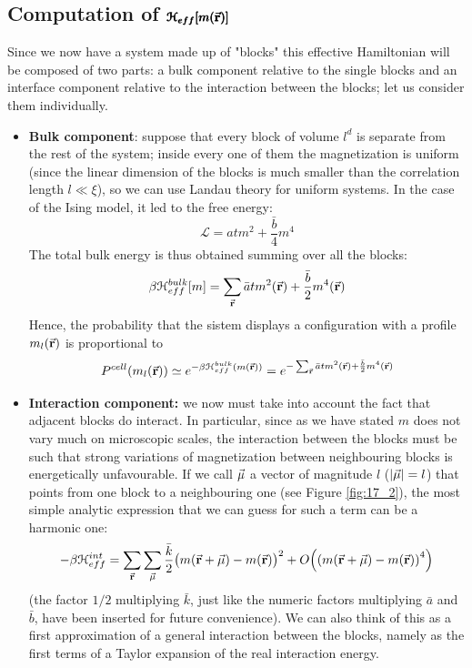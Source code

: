 \documentclass[../../Main/Main.tex]{subfiles}
\begin{document}
\subsection{Computation of \( \pmb{\mathcal{H}_{eff} [m(\va{r})]}\)}
 Since we now have a system made up of "blocks" this effective Hamiltonian will be composed of two parts: a bulk component relative to the single blocks and an interface component relative to the interaction between the blocks; let us consider them individually.

 \begin{itemize}
 \item \textbf{Bulk component}: suppose that every block of volume \( l^d \)  is separate from the rest of the system; inside every one of them the magnetization is uniform (since the linear dimension of the blocks is much smaller than the correlation length  \( l \ll \xi  \)), so we can use Landau theory for uniform systems. In the case of the Ising model, it led to the free energy:
\begin{equation*}
  \mathcal{L} = a t m^2 + \frac{\bar{b} }{4} m^4
\end{equation*}
The total bulk energy is thus obtained summing over all the blocks:
\begin{equation}
  \beta \mathcal{H}_{eff}^{bulk} [m] = \sum_{\va{r}}^{}  \bar{a} t m^2 (\va{r})+ \frac{\bar{b} }{2} m^4 (\va{r})
\end{equation}
Hence, the probability that the sistem displays a configuration with a profile \( m_l (\va{r}) \) is proportional to
\begin{equation}
  P^{cell} (m_l (\va{r})) \simeq e^{-\beta \mathcal{H}_{eff}^{bulk} (m (\va{r}))} = e^{ - \sum_{\va{r}}^{}  \bar{a} t m^2 (\va{r})+ \frac{\bar{b} }{2} m^4 (\va{r}) }
\end{equation}


\item \textbf{Interaction component:} we now must take into account the fact that adjacent blocks do interact. In particular, since as we have stated \( m \) does not vary much on microscopic scales, the interaction between the blocks must be such that strong variations of magnetization between neighbouring blocks is energetically unfavourable. If we call \( \va{\mu } \) a vector of magnitude \( l \) (\( \abs{\va{\mu }} =l  \)) that points from one block to a neighbouring one (see Figure \ref{fig:17_2}), the most simple analytic expression that we can guess for such a term can be a harmonic one:
\begin{equation}
  - \beta \mathcal{H}_{eff}^{int} =   \sum_{\va{r}}^{}  \sum_{\va{\mu }}^{}  \frac{\bar{k} }{2} \big( m (\va{r}+\va{\mu }) - m(\va{r})\big)^2 + O \qty( \qty(m (\va{r}+\va{\mu }) - m(\va{r}))^4 )
 \end{equation}
 (the factor \( 1/2 \) multiplying \( \bar{k}  \), just like the numeric factors multiplying \( \bar{a}  \)  and \( \bar{b}  \), have been inserted for future convenience). We can also think of this as a first approximation of a general interaction between the blocks, namely as the first terms of a Taylor expansion of the real interaction energy.


\end{itemize}
\end{document}
